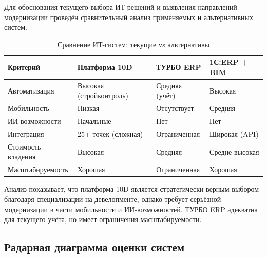 \documentclass[12pt,a4paper]{article}
\begin{document}
Для обоснования текущего выбора ИТ-решений и выявления направлений модернизации проведён сравнительный анализ применяемых и альтернативных систем.

\begin{table}[H]
\centering
\caption{Сравнение ИТ-систем: текущие vs альтернативы}
\label{tab:it_compare}
\small
\begin{tabularx}{\textwidth}{|l|X|X|X|}
\hline
\rowcolor{samoletlight}
\textbf{Критерий} & \textbf{Платформа 10D} & \textbf{ТУРБО ERP} & \textbf{1С:ERP + BIM} \\
\hline
Автоматизация & Высокая (стройконтроль) & Средняя (учёт) & Высокая \\
\hline
Мобильность & Низкая & Отсутствует & Средняя \\
\hline
ИИ-возможности & Начальные & Нет & Нет \\
\hline
Интеграция & 25+ точек (сложная) & Ограниченная & Широкая (API) \\
\hline
Стоимость владения & Высокая & Средняя & Средне-высокая \\
\hline
Масштабируемость & Хорошая & Ограниченная & Хорошая \\
\hline
\end{tabularx}
\end{table}

Анализ показывает, что платформа 10D является стратегически верным выбором благодаря специализации на девелопменте, однако требует серьёзной модернизации в части мобильности и ИИ-возможностей. ТУРБО ERP адекватна для текущего учёта, но имеет ограничения масштабируемости.

\subsection{Радарная диаграмма оценки систем}
\end{document}
